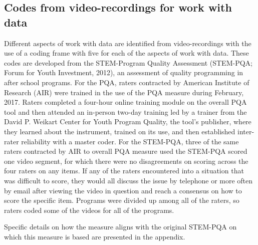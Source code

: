 \documentclass[]{msu-thesis}
\theoremstyle{definition}
\theoremstyle{definition}
\theoremstyle{definition}
\theoremstyle{remark}
\begin{document}
\subsection{Codes from video-recordings for work with
data}\label{codes-from-video-recordings-for-work-with-data}

Different aspects of work with data are identified from video-recordings
with the use of a coding frame with five for each of the aspects of work
with data. These codes are developed from the STEM-Program Quality
Assessment (STEM-PQA; Forum for Youth Investment, 2012), an assessment
of quality programming in after school programs. For the PQA, raters
contracted by American Institute of Research (AIR) were trained in the
use of the PQA measure during February, 2017. Raters completed a
four-hour online training module on the overall PQA tool and then
attended an in-person two-day training led by a trainer from the David
P. Weikart Center for Youth Program Quality, the tool's publisher, where
they learned about the instrument, trained on its use, and then
established inter-rater reliability with a master coder. For the
STEM-PQA, three of the same raters contracted by AIR to overall PQA
measure used the STEM-PQA scored one video segment, for which there were
no disagreements on scoring across the four raters on any items. If any
of the raters encountered into a situation that was difficult to score,
they would all discuss the issue by telephone or more often by email
after viewing the video in question and reach a consensus on how to
score the specific item. Programs were divided up among all of the
raters, so raters coded some of the videos for all of the programs.

Specific details on how the measure aligns with the original STEM-PQA on
which this measure is based are presented in the appendix.

\begin{table}

\caption{\label{tab:unnamed-chunk-6}Coding Frame for Work With Data}
\centering
{}
\end{table}
\end{document}

